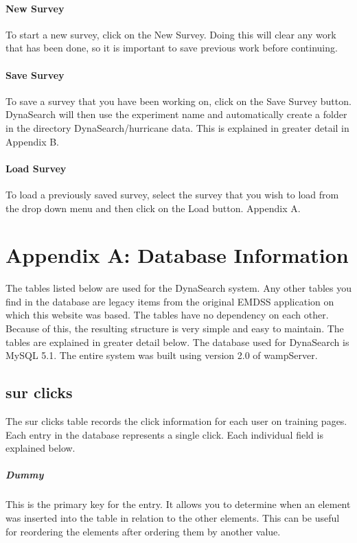 \documentclass[article]{ij4uq}              %
\begin{document}
\paragraph{New Survey}
To start a new survey, click on the New Survey. Doing this will clear any work that has been done, so it is important to save previous work before continuing.

\paragraph{Save Survey}
To save a survey that you have been working on, click on the Save Survey button. DynaSearch will then use the experiment name and automatically create a folder in the directory DynaSearch/hurricane data. This is explained in greater detail in Appendix B.

\paragraph{Load Survey}
To load a previously saved survey, select the survey that you wish to load from the drop down menu and then click on the Load button. 
Appendix A.

\section{Appendix A: Database Information}
The tables listed below are used for the DynaSearch system. Any other tables you find in the database are legacy items from the original EMDSS application on which this website was based. The tables have no dependency on each other. Because of this, the resulting structure is very simple and easy to maintain. The tables are explained in greater detail below. The database used for DynaSearch is MySQL 5.1. The entire system was built using version 2.0 of wampServer.

\subsection{sur clicks}
The sur clicks table records the click information for each user on training pages. Each entry in the database represents a single click. Each individual field is explained below. 

\subparagraph{Dummy}
This is the primary key for the entry. It allows you to determine when an element was inserted into the table in relation to the other elements. This can be useful for reordering the elements after ordering them by another value.
\end{document}
